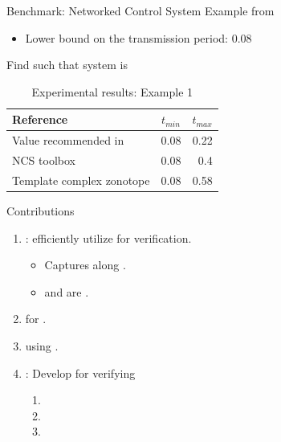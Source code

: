 \begin{frame}{Benchmark: Networked Control System}
Example from
~\cite{wittenmark2002computer}

\begin{itemize}
\item Lower bound on the transmission period: $0.08$
\end{itemize}
%
\begin{alertblock}{}
Find   such that
system is 
\end{alertblock}
%
\begin{table}
\begin{tabular}{|l|c|r|}
  \hline
  Reference & $t_{min}$ & $t_{max}$ \\
\hline
Value recommended in~\cite{wittenmark2002computer} & 0.08 & 0.22\\
  \hline
  NCS toolbox~\cite{BauLoo_NECSYS12a} & 0.08 & 0.4 \\
\hline
  Template complex zonotope & 0.08 & 0.58 \\
  \hline
\end{tabular}
\caption{Experimental results: Example 1}
\end{table}
%
\end{frame}


\begin{frame}{Contributions}
\begin{enumerate}
\item {}: efficiently utilize  for verification.
%
\begin{itemize}
\item Captures  along .
\item {} and  are .
\end{itemize}
%
\pause
\item {} for .
\pause
\item {} using .
\pause
\item {}:  Develop  for verifying
%
\begin{enumerate}
\item {}
\item {}
\item {}
 \end{enumerate}
\end{enumerate}
\end{frame}

